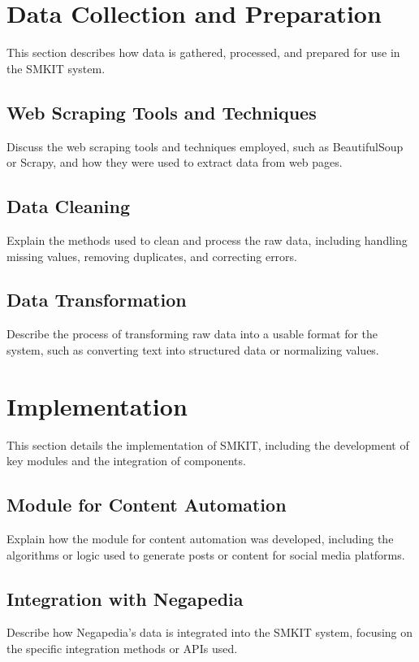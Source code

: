 \section{Data Collection and Preparation}
\label{sec:data_collection_preparation}
This section describes how data is gathered, processed, and prepared for use in the SMKIT system.

\subsection{Web Scraping Tools and Techniques}
\label{subsec:web_scraping_tools_techniques}
Discuss the web scraping tools and techniques employed, such as BeautifulSoup or Scrapy, and how they were used to extract data from web pages.

\subsection{Data Cleaning}
\label{subsec:data_cleaning}
Explain the methods used to clean and process the raw data, including handling missing values, removing duplicates, and correcting errors.

\subsection{Data Transformation}
\label{subsec:data_transformation}
Describe the process of transforming raw data into a usable format for the system, such as converting text into structured data or normalizing values.

\section{Implementation}
\label{sec:implementation}
This section details the implementation of SMKIT, including the development of key modules and the integration of components.

\subsection{Module for Content Automation}
\label{subsec:module_for_content_automation}
Explain how the module for content automation was developed, including the algorithms or logic used to generate posts or content for social media platforms.

\subsection{Integration with Negapedia}
\label{subsec:integration_with_negapedia}
Describe how Negapedia’s data is integrated into the SMKIT system, focusing on the specific integration methods or APIs used.

